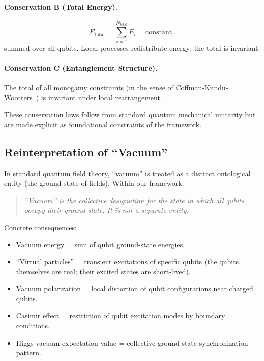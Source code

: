 \documentclass[11pt,a4paper]{article}
\begin{document}
\paragraph{Conservation B (Total Energy).}
\begin{equation}
E_{\text{total}} = \sum_{i=1}^{N_{\text{total}}} E_i = \text{constant},
\end{equation}
summed over all qubits. Local processes redistribute energy; the total is invariant.

\paragraph{Conservation C (Entanglement Structure).}
The total of all monogamy constraints (in the sense of Coffman-Kundu-Wootters~\cite{CKW2000}) is invariant under local rearrangement.

These conservation laws follow from standard quantum mechanical unitarity but are made explicit as foundational constraints of the framework.

\subsection{Reinterpretation of ``Vacuum''}

In standard quantum field theory, ``vacuum'' is treated as a distinct ontological entity (the ground state of fields). Within our framework:
\begin{quote}
\textit{``Vacuum'' is the collective designation for the state in which all qubits occupy their ground state. It is not a separate entity.}
\end{quote}

Concrete consequences:
\begin{itemize}[leftmargin=*]
\item Vacuum energy = sum of qubit ground-state energies.
\item ``Virtual particles'' = transient excitations of specific qubits (the qubits themselves are real; their excited states are short-lived).
\item Vacuum polarization = local distortion of qubit configurations near charged qubits.
\item Casimir effect = restriction of qubit excitation modes by boundary conditions.
\item Higgs vacuum expectation value = collective ground-state synchronization pattern.
\end{itemize}
\end{document}
